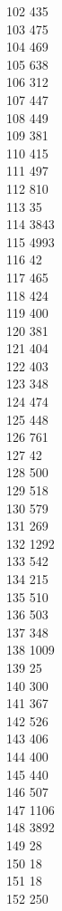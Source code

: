{ 102	435 \\
 103	475 \\
 104	469 \\
 105	638 \\
 106	312 \\
 107	447 \\
 108	449 \\
 109	381 \\
 110	415 \\
 111	497 \\
 112	810 \\
 113	35 \\
 114	3843 \\
 115	4993 \\
 116	42 \\
 117	465 \\
 118	424 \\
 119	400 \\
 120	381 \\
 121	404 \\
 122	403 \\
 123	348 \\
 124	474 \\
 125	448 \\
 126	761 \\
 127	42 \\
 128	500 \\
 129	518 \\
 130	579 \\
 131	269 \\
 132	1292 \\
 133	542 \\
 134	215 \\
 135	510 \\
 136	503 \\
 137	348 \\
 138	1009 \\
 139	25 \\
 140	300 \\
 141	367 \\
 142	526 \\
 143	406 \\
 144	400 \\
 145	440 \\
 146	507 \\
 147	1106 \\
 148	3892 \\
 149	28 \\
 150	18 \\
 151	18 \\
 152	250 \\
}
